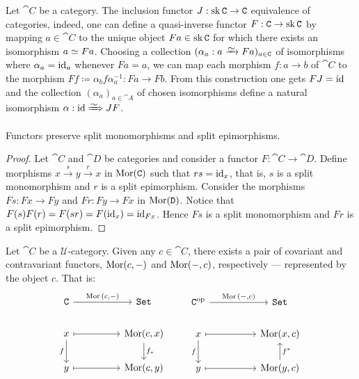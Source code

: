 \begin{example}
    \label{exp:skeletal-functor}
    Let \(\cat C\) be a category. The inclusion functor \(J: \operatorname{sk} \texttt C \to \texttt C\)
    equivalence of categories, indeed, one can define a quasi-inverse functor
    \(F: \texttt C \to \operatorname{sk} \texttt C\) by mapping \(a \in \cat C\) to the unique object
    \(F a \in \operatorname{sk} \texttt C\) for which there exists an isomorphism \(a \simeq F
    a\). Choosing a collection \((\alpha_a: a \isoto F a)_{a \in \cat C}\) of
    isomorphisms where \(\alpha_a = \operatorname{id}_a\) whenever \(F a = a\), we can map each
    morphism \(f: a \to b\) of \(\cat C\) to the morphism
    \(F f \coloneq \alpha_b f \alpha_a^{-1}: F a \to F b\). From this construction
    one gets \(F J = \operatorname{id}\) and the collection \((\alpha_a)_{a \in \cat A}\) of
    chosen isomorphisms define a natural isomorphism \(\alpha: \Id \isonat J F\).
\end{example}

\begin{lemma}\label{lem: func-preserve-split}
    Functors preserve split monomorphisms and split epimorphisms.
\end{lemma}

\begin{proof}
    Let \(\cat C\) and \(\cat D\) be categories and consider a functor \(F: \cat C
    \to \cat D\). Define morphisms \(x \xrightarrow s y \xrightarrow r x\) in
    \(\operatorname{Mor}(\texttt C)\) such that \(r s = \operatorname{id}_x\), that is, \(s\) is a split
    monomorphism and \(r\) is a split epimorphism. Consider the morphisms \(F s: F
    x \to F y\) and \(F r: F y \to F x\) in \(\operatorname{Mor}(\texttt D)\). Notice that \(F (s)
    F(r) = F(s r) = F(\operatorname{id}_x) = \operatorname{id}_{F x}\). Hence \(F s\) is a split monomorphism
    and \(F r\) is a split epimorphism.
\end{proof}

\begin{definition}\label{def:hom-functors}
    Let \(\cat C\) be a \(\mathcal U\)-category. Given any \(c \in \cat C\), there
    exists a pair of covariant and contravariant functors, \(\operatorname{Mor}(c, -)\) and
    \(\operatorname{Mor}(-, c)\), respectively --- represented by the object \(c\). That is:
    \[
        \begin{tikzcd}
            \cat C \ar[rr, "\Hom{(c, -)}"] & & \Set
            \\
            x \ar[rr, maps to] \ar[d, swap, "f"]
            & & \Hom(c, x) \ar[d, "f_*"]
            \\
            y \ar[rr, maps to] & & \Hom(c, y)
        \end{tikzcd}
        \qquad
        \begin{tikzcd}
            \cat C^\op \ar[rr, "\Hom{(-, c)}"] & & \Set
            \\
            x \ar[rr, maps to] \ar[d, swap, "f"]
            & & \Hom(x, c)
            \\
            y \ar[rr, maps to] & & \Hom(y, c) \ar[u, swap, "f^*"]
        \end{tikzcd}
    \]
\end{definition}


